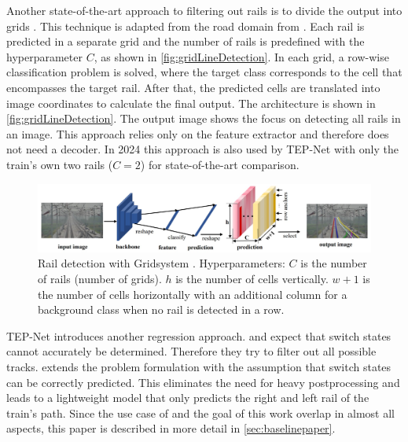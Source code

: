 
Another state-of-the-art approach to filtering out rails is to divide the output into grids \cite{li2022rail}.
This technique is adapted from the road domain from \cite{laneDetectionGrid2020}.
Each rail is predicted in a separate grid and the number of rails is predefined with the hyperparameter $C$, as shown in \autoref{fig:gridLineDetection}.
In each grid, a row-wise classification problem is solved, where the target class corresponds to the cell that encompasses the target rail.
After that, the predicted cells are translated into image coordinates to calculate the final output.
The architecture is shown in \autoref{fig:gridLineDetection}.
The output image shows the focus on detecting all rails in an image.
This approach relies only on the feature extractor and therefore does not need a decoder.
In 2024 this approach is also used by TEP-Net \cite{tepNet2024} with only the train's own two rails ($C=2$) for state-of-the-art comparison.

\begin{figure}[H]
    \centering
    \includegraphics[width=\linewidth]{PICs/lineDetection/gridDetection.jpg}
    \caption{Rail detection with Gridsystem \cite{li2022rail}. Hyperparameters: $C$ is the number of rails (number of grids). $h$ is the number of cells vertically. $w+1$ is the number of cells horizontally with an additional column for a background class when no rail is detected in a row.}
    \label{fig:gridLineDetection}
\end{figure}

\noindent \ac{TEP}-Net \cite{tepNet2024} introduces another regression approach.
\cite{RailraodSemanticPossibleTracks2020} and \cite{TPENet2023} expect that switch states cannot accurately be determined.
Therefore they try to filter out all possible tracks.
\cite{tepNet2024} extends the problem formulation with the assumption that switch states can be correctly predicted.
This eliminates the need for heavy postprocessing and leads to a lightweight model that only predicts the right and left rail of the train's path.
Since the use case of \cite{tepNet2024} and the goal of this work overlap in almost all aspects, this paper is described in more detail in \autoref{sec:baselinepaper}.